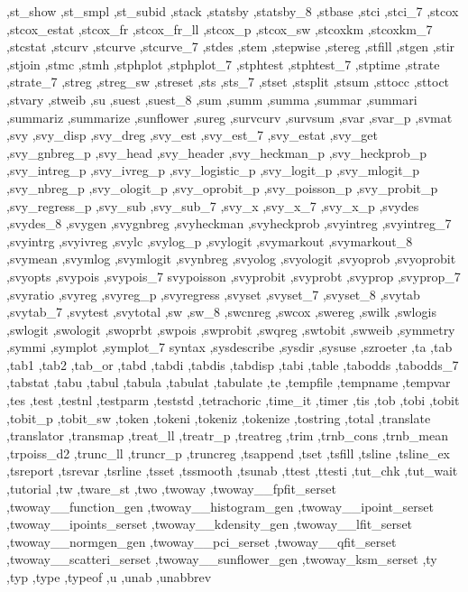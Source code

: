 {{    ,st_show ,st_smpl ,st_subid ,stack ,statsby ,statsby_8 ,stbase
    ,stci ,stci_7 ,stcox ,stcox_estat ,stcox_fr ,stcox_fr_ll ,stcox_p
    ,stcox_sw ,stcoxkm ,stcoxkm_7 ,stcstat ,stcurv ,stcurve ,stcurve_7
    ,stdes ,stem ,stepwise ,stereg ,stfill ,stgen ,stir ,stjoin ,stmc
    ,stmh ,stphplot ,stphplot_7 ,stphtest ,stphtest_7 ,stptime ,strate
    ,strate_7 ,streg ,streg_sw ,streset ,sts ,sts_7 ,stset ,stsplit
    ,stsum ,sttocc ,sttoct ,stvary ,stweib ,su ,suest ,suest_8 ,sum
    ,summ ,summa ,summar ,summari ,summariz ,summarize ,sunflower
    ,sureg ,survcurv ,survsum ,svar ,svar_p ,svmat ,svy ,svy_disp
    ,svy_dreg ,svy_est ,svy_est_7 ,svy_estat ,svy_get ,svy_gnbreg_p
    ,svy_head ,svy_header ,svy_heckman_p ,svy_heckprob_p ,svy_intreg_p
    ,svy_ivreg_p ,svy_logistic_p ,svy_logit_p ,svy_mlogit_p ,svy_nbreg_p
    ,svy_ologit_p ,svy_oprobit_p ,svy_poisson_p ,svy_probit_p
    ,svy_regress_p ,svy_sub ,svy_sub_7 ,svy_x ,svy_x_7 ,svy_x_p ,svydes
    ,svydes_8 ,svygen ,svygnbreg ,svyheckman ,svyheckprob ,svyintreg
    ,svyintreg_7 ,svyintrg ,svyivreg ,svylc ,svylog_p ,svylogit
    ,svymarkout ,svymarkout_8 ,svymean ,svymlog ,svymlogit ,svynbreg
    ,svyolog ,svyologit ,svyoprob ,svyoprobit ,svyopts ,svypois
    ,svypois_7 svypoisson ,svyprobit ,svyprobt ,svyprop ,svyprop_7
    ,svyratio ,svyreg ,svyreg_p ,svyregress ,svyset ,svyset_7 ,svyset_8
    ,svytab ,svytab_7 ,svytest ,svytotal ,sw ,sw_8 ,swcnreg ,swcox
    ,swereg ,swilk ,swlogis ,swlogit ,swologit ,swoprbt ,swpois
    ,swprobit ,swqreg ,swtobit ,swweib ,symmetry ,symmi ,symplot
    ,symplot_7 syntax ,sysdescribe ,sysdir ,sysuse ,szroeter ,ta ,tab
    ,tab1 ,tab2 ,tab_or ,tabd ,tabdi ,tabdis ,tabdisp ,tabi ,table
    ,tabodds ,tabodds_7 ,tabstat ,tabu ,tabul ,tabula ,tabulat ,tabulate
    ,te ,tempfile ,tempname ,tempvar ,tes ,test ,testnl ,testparm
    ,teststd ,tetrachoric ,time_it ,timer ,tis ,tob ,tobi ,tobit
    ,tobit_p ,tobit_sw ,token ,tokeni ,tokeniz ,tokenize ,tostring
    ,total ,translate ,translator ,transmap ,treat_ll ,treatr_p
    ,treatreg ,trim ,trnb_cons ,trnb_mean ,trpoiss_d2 ,trunc_ll
    ,truncr_p ,truncreg ,tsappend ,tset ,tsfill ,tsline ,tsline_ex
    ,tsreport ,tsrevar ,tsrline ,tsset ,tssmooth ,tsunab ,ttest
    ,ttesti ,tut_chk ,tut_wait ,tutorial ,tw ,tware_st ,two ,twoway
    ,twoway__fpfit_serset ,twoway__function_gen ,twoway__histogram_gen
    ,twoway__ipoint_serset ,twoway__ipoints_serset ,twoway__kdensity_gen
    ,twoway__lfit_serset ,twoway__normgen_gen ,twoway__pci_serset
    ,twoway__qfit_serset ,twoway__scatteri_serset ,twoway__sunflower_gen
    ,twoway_ksm_serset ,ty ,typ ,type ,typeof ,u ,unab ,unabbrev
}}
